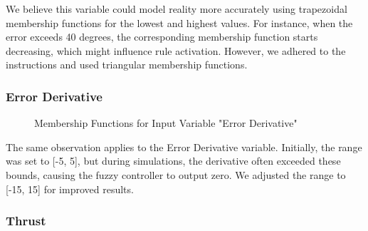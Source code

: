 \documentclass[12pt]{article}
\begin{document}
We believe this variable could model reality more accurately using trapezoidal membership functions for the lowest and highest values. For instance, when the error exceeds 40 degrees, the corresponding membership function starts decreasing, which might influence rule activation. However, we adhered to the instructions and used triangular membership functions.

\subsubsection{Error Derivative}

\begin{figure}[H]
    \centering
    \caption{Membership Functions for Input Variable "Error Derivative"}
\end{figure}

The same observation applies to the Error Derivative variable. Initially, the range was set to [-5, 5], but during simulations, the derivative often exceeded these bounds, causing the fuzzy controller to output zero. We adjusted the range to [-15, 15] for improved results.

\subsubsection{Thrust}
\end{document}

